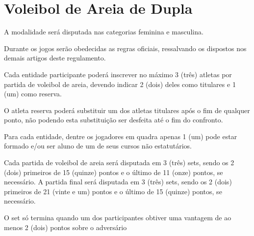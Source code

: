 {\let\clearpage\relax \chapter{Voleibol de Areia de Dupla}}

\begin{article}
	A modalidade será disputada nas categorias feminina e masculina.
\end{article}

\begin{article}
	Durante os jogos serão obedecidas as regras oficiais, ressalvando os dispostos nos demais artigos deste regulamento.
\end{article}

\begin{article}
	Cada entidade participante poderá inscrever no máximo 3 (três) atletas por partida de voleibol de areia, devendo indicar 2 (dois) deles como titulares e 1 (um) como reserva.

	\begin{xparagraph}
		O atleta reserva poderá substituir um dos atletas titulares após o fim de qualquer ponto, não podendo esta substituição ser desfeita até o fim do confronto.
	\end{xparagraph}
	
	\begin{xparagraph}
	    Para cada entidade, dentre os jogadores em quadra apenas 1 (um) pode estar formado e/ou ser aluno de um de seus cursos não estatutários.
	\end{xparagraph}
\end{article}

\begin{article}
	Cada partida de voleibol de areia será disputada em 3 (três) sets, sendo os 2 (dois) primeiros de 15 (quinze) pontos e o último de 11 (onze) pontos, se necessário. A partida final será disputada em 3 (três) sets, sendo os 2 (dois) primeiros de 21 (vinte e um) pontos e o último de 15 (quinze) pontos, se necessário.

	\begin{xparagraph}
		O set só termina quando um dos participantes obtiver uma vantagem de ao menos 2 (dois) pontos sobre o adversário
	\end{xparagraph}
\end{article}
